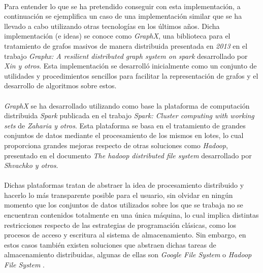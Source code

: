 \documentclass{subfiles}
\begin{document}
      \paragraph{}
      Para entender lo que se ha pretendido conseguir con esta implementación, a continuación se ejemplifica un caso de una implementación similar que se ha llevado a cabo utilizando otras tecnologías en los últimos años. Dicha implementación (e ideas) se conoce como \emph{GraphX}, una biblioteca para el tratamiento de grafos masivos de manera distribuida presentada en \emph{2013} en el trabajo \emph{Graphx: A resilient distributed graph system on spark} \cite{xin2013graphx} desarrollado por \emph{Xin y otros}. Esta implementación se desarrolló inicialmente como un conjunto de utilidades y procedimientos sencillos para facilitar la representación de grafos y el desarrollo de algoritmos sobre estos.

      \paragraph{}
      \emph{GraphX} se ha desarrollado utilizando como base la plataforma de computación distribuida \emph{Spark} publicada en el trabajo \emph{Spark: Cluster computing with working sets} \cite{zaharia2010spark} de \emph{Zaharia y otros}. Esta plataforma se basa en el tratamiento de grandes conjuntos de datos mediante el procesamiento de los mismos en lotes, lo cual proporciona grandes mejoras respecto de otras soluciones como \emph{Hadoop}, presentado en el documento \emph{The hadoop distributed file system} \cite{shvachko2010hadoop} desarrollado por \emph{Shvachko y otros}.

      \paragraph{}
      Dichas plataformas tratan de abstraer la idea de procesamiento distribuido y hacerlo lo más transparente posible para el usuario, sin olvidar en ningún momento que los conjuntos de datos utilizados sobre los que se trabaja no se encuentran contenidos totalmente en una única máquina, lo cual implica distintas restricciones respecto de las estrategias de programación clásicas, como los procesos de acceso y escritura al sistema de almacenamiento. Sin embargo, en estos casos también existen soluciones que abstraen dichas tareas de almacenamiento distribuidas, algunas de ellas son \emph{Google File System} \cite{ghemawat2003google} o \emph{Hadoop File System} \cite{shvachko2010hadoop}.
\end{document}
